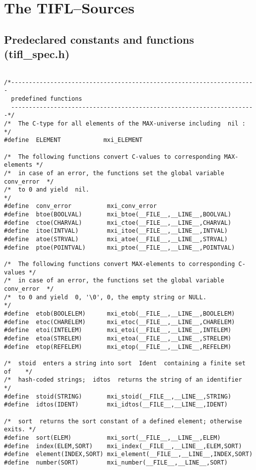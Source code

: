 \chapter{The TIFL--Sources}
\section{Predeclared constants and functions (tifl\_spec.h)}
\begin{verbatim}

/*---------------------------------------------------------------------
  predefined functions 
  ---------------------------------------------------------------------*/
/*  The C-type for all elements of the MAX-universe including  nil :       */
#define  ELEMENT            mxi_ELEMENT

/*  The following functions convert C-values to corresponding MAX-elements */
/*  in case of an error, the functions set the global variable conv_error  */
/*  to 0 and yield  nil.                                                   */
#define  conv_error          mxi_conv_error        
#define  btoe(BOOLVAL)       mxi_btoe(__FILE__,__LINE__,BOOLVAL)
#define  ctoe(CHARVAL)       mxi_ctoe(__FILE__,__LINE__,CHARVAL)
#define  itoe(INTVAL)        mxi_itoe(__FILE__,__LINE__,INTVAL)
#define  atoe(STRVAL)        mxi_atoe(__FILE__,__LINE__,STRVAL)
#define  ptoe(POINTVAL)      mxi_ptoe(__FILE__,__LINE__,POINTVAL)

/*  The following functions convert MAX-elements to corresponding C-values */
/*  in case of an error, the functions set the global variable conv_error  */
/*  to 0 and yield  0, '\0', 0, the empty string or NULL.                 */
#define  etob(BOOLELEM)      mxi_etob(__FILE__,__LINE__,BOOLELEM)
#define  etoc(CHARELEM)      mxi_etoc(__FILE__,__LINE__,CHARELEM)
#define  etoi(INTELEM)       mxi_etoi(__FILE__,__LINE__,INTELEM)
#define  etoa(STRELEM)       mxi_etoa(__FILE__,__LINE__,STRELEM)
#define  etop(REFELEM)       mxi_etop(__FILE__,__LINE__,REFELEM)

/*  stoid  enters a string into sort  Ident  containing a finite set of    */
/*  hash-coded strings;  idtos  returns the string of an identifier        */
#define  stoid(STRING)       mxi_stoid(__FILE__,__LINE__,STRING)
#define  idtos(IDENT)        mxi_idtos(__FILE__,__LINE__,IDENT)

/*  sort  returns the sort constant of a defined element; otherwise exits. */
#define  sort(ELEM)          mxi_sort(__FILE__,__LINE__,ELEM)
#define  index(ELEM,SORT)    mxi_index(__FILE__,__LINE__,ELEM,SORT)
#define  element(INDEX,SORT) mxi_element(__FILE__,__LINE__,INDEX,SORT)
#define  number(SORT)        mxi_number(__FILE__,__LINE__,SORT)


\end{verbatim}
